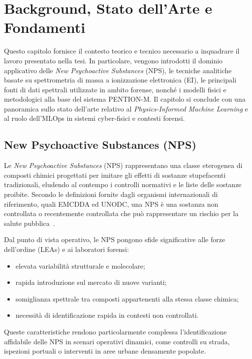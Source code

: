 
\chapter{Background, Stato dell’Arte e Fondamenti}
\label{chap:background}

Questo capitolo fornisce il contesto teorico e tecnico necessario a inquadrare il lavoro presentato nella tesi.
In particolare, vengono introdotti il dominio applicativo delle \emph{New Psychoactive Substances} (NPS), le tecniche analitiche basate su spettrometria di massa a ionizzazione elettronica (EI), le principali fonti di dati spettrali utilizzate in ambito forense, nonché i modelli fisici e metodologici alla base del sistema PENTION-M.
Il capitolo si conclude con una panoramica sullo stato dell’arte relativo al \emph{Physics-Informed Machine Learning} e al ruolo dell’MLOps in sistemi cyber-fisici e contesti forensi.

\section{New Psychoactive Substances (NPS)}
\label{sec:nps}

Le \emph{New Psychoactive Substances} (NPS) rappresentano una classe eterogenea di composti chimici progettati per imitare gli effetti di sostanze stupefacenti tradizionali, eludendo al contempo i controlli normativi e le liste delle sostanze proibite.
Secondo le definizioni fornite dagli organismi internazionali di riferimento, quali EMCDDA ed UNODC, una NPS è una sostanza non controllata o recentemente controllata che può rappresentare un rischio per la salute pubblica~\cite{emcdda_nps, unodc_nps}.

Dal punto di vista operativo, le NPS pongono sfide significative alle forze dell’ordine (LEAs) e ai laboratori forensi:
\begin{itemize}
	\item elevata variabilità strutturale e molecolare;
	\item rapida introduzione sul mercato di nuove varianti;
	\item somiglianza spettrale tra composti appartenenti alla stessa classe chimica;
	\item necessità di identificazione rapida in contesti non controllati.
\end{itemize}

Queste caratteristiche rendono particolarmente complessa l’identificazione affidabile delle NPS in scenari operativi dinamici, come controlli su strada, ispezioni portuali o interventi in aree urbane densamente popolate.

